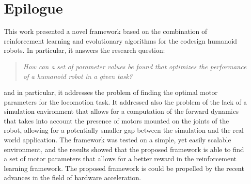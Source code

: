 \chapter*{Epilogue}
\label{chp:99-Epilogue}

This work presented a novel framework based on the combination of reinforcement learning and evolutionary algorithms for the codesign humanoid robots. In particular, it answers the research question:

\begin{quote}
    \textit{
        How can a set of parameter values be found that optimizes the performance of a humanoid robot in a given task?}
\end{quote}

and in particular, it addresses the problem of finding the optimal motor parameters for the locomotion task. It addressed also the problem of the lack of a simulation environment that allows for a computation of the forward dynamics that takes into account the presence of motors mounted on the joints of the robot, allowing for a potentially smaller gap between the simulation and the real world application.
The framework was tested on a simple, yet easily scalable environment, and the results showed that the proposed framework is able to find a set of motor parameters that allows for a better reward in the reinforcement learning framework.
The proposed framework is could be propelled by the recent advances in the field of hardware acceleration.

